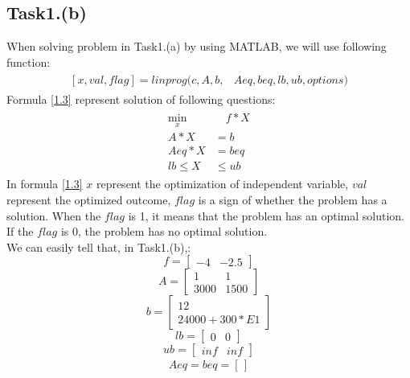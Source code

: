 \documentclass[titlepage,a4paper]{article}
\begin{document}
    \subsection{Task1.(b)}
        When solving problem in Task1.(a) by using MATLAB, we will use following function:
        \begin{align}\label{1.3}
        \begin{split}  
            [x,val,flag] = linprog(c,A,b,&Aeq,beq,lb,ub,options)
        \end{split}    
        \end{align}    
        Formula \eqref{1.3} represent solution of following questions:
        \begin{align}\label{1.4}
        \begin{split}  
            \min_x &\quad f*X\\
            A*X &= b\\
            Aeq*X &= beq\\
            lb\leq X &\leq ub
        \end{split}    
        \end{align} 
        In formula \eqref{1.3} $x$ represent the optimization of independent variable, $val$ represent the optimized outcome, $flag$ is a sign of whether the problem has a solution. When the $flag$ is 1, it means that the problem has an optimal solution. If the $flag$ is 0, the problem has no optimal solution.\\
        We can easily tell that, in Task1.(b),:
        \[ f = \begin{bmatrix}\label{1.5}
        -4&-2.5
        \end{bmatrix}\]
        \[ A = \begin{bmatrix}\label{1.6}
        1&1\\
        3000&1500
        \end{bmatrix}\]
        \[ b = \begin{bmatrix}\label{1.7}
        12\\
        24000+300*E1
        \end{bmatrix}\]
        \[ lb = \begin{bmatrix}\label{1.8}
        0&0
        \end{bmatrix}\]
        \[ ub = \begin{bmatrix}\label{1.9}
        inf&inf
        \end{bmatrix}\]
        \begin{align}\label{1.10}
            Aeq = beq = [\,]
        \end{align} 
\end{document}
